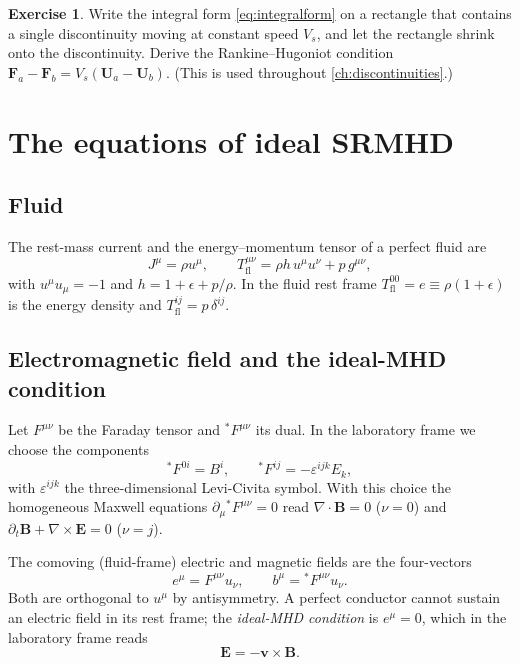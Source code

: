 \documentclass[11pt,a4paper,oneside,openany]{book}
\theoremstyle{definition}
\newtheorem{exercise}{Exercise}[chapter]
\theoremstyle{plain}
\theoremstyle{remark}
\newcommand{\vv}{\bm{v}}
\newcommand{\BB}{\bm{B}}
\newcommand{\EE}{\bm{E}}
\newcommand{\UU}{\bm{U}}
\newcommand{\FF}{\bm{F}}
\begin{document}
\begin{exercise}
Write the integral form \eqref{eq:integralform} on a rectangle that contains a single
discontinuity moving at constant speed $V_s$, and let the rectangle shrink onto the
discontinuity. Derive the Rankine--Hugoniot condition $\FF_a-\FF_b=V_s(\UU_a-\UU_b)$.
(This is used throughout \cref{ch:discontinuities}.)
\end{exercise}

\chapter{The equations of ideal SRMHD}\label{ch:equations}

\section{Fluid}

The rest-mass current and the energy--momentum tensor of a perfect fluid are
\begin{equation}
J^\mu=\rho u^\mu,\qquad
T^{\mu\nu}_{\mathrm{fl}}=\rho h\,u^\mu u^\nu+p\,g^{\mu\nu},
\end{equation}
with $u^\mu u_\mu=-1$ and $h=1+\epsilon+p/\rho$. In the fluid rest frame
$T^{00}_{\mathrm{fl}}=e\equiv\rho(1+\epsilon)$ is the energy density and
$T^{ij}_{\mathrm{fl}}=p\,\delta^{ij}$.

\section{Electromagnetic field and the ideal-MHD condition}\label{sec:bmu}

Let $F^{\mu\nu}$ be the Faraday tensor and ${}^\ast\!F^{\mu\nu}$ its dual. In the
laboratory frame we choose the components
\begin{equation}\label{eq:dualF}
{}^\ast\!F^{0i}=B^i,\qquad {}^\ast\!F^{ij}=-\varepsilon^{ijk}E_k ,
\end{equation}
with $\varepsilon^{ijk}$ the three-dimensional Levi-Civita symbol. With this choice the
homogeneous Maxwell equations $\partial_\mu{}^\ast\!F^{\mu\nu}=0$ read
$\nabla\cdot\BB=0$ ($\nu=0$) and $\partial_t\BB+\nabla\times\EE=0$ ($\nu=j$).

The comoving (fluid-frame) electric and magnetic fields are the four-vectors
\begin{equation}
e^\mu=F^{\mu\nu}u_\nu,\qquad b^\mu={}^\ast\!F^{\mu\nu}u_\nu .
\end{equation}
Both are orthogonal to $u^\mu$ by antisymmetry. A perfect conductor cannot sustain an
electric field in its rest frame; the \emph{ideal-MHD condition} is $e^\mu=0$, which in
the laboratory frame reads
\begin{equation}\label{eq:idealmhd}
\EE=-\vv\times\BB .
\end{equation}
\end{document}
